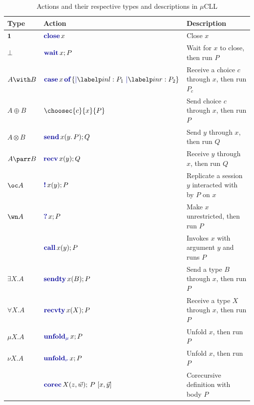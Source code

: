 \begin{table}
    \centering
    \caption{Actions and their respective types and descriptions in $\mu$CLL}
    \label{tab:muCLLActions}
    \begin{tabular}{lll}
        \toprule
        Type          & Action                                            & Description                                           \\
        \midrule
        $\mathbf{1}$  & $\closec{x}$                                      & Close $x$                                             \\
        $\bot$        & $\waitc{x}{P}$                                    & Wait for $x$ to close, then run $P$                   \\
        $A \with B$   & $\casec{x}{\labelc{inl}{P_1}\ \labelc{inr}{P_2}}$ & Receive a choice $c$ through $x$, then run $P_c$      \\
        $A \oplus B$  & $\choosec{c}{x}{P}$                               & Send choice $c$ through $x$, then run $P$             \\
        $A \otimes B$ & $\sendc{x}{y}{P}{Q}$                              & Send $y$ through $x$, then run $Q$                    \\
        $A \parr B$   & $\recvc{x}{y}{Q}$                                 & Receive $y$ through $x$, then run $Q$                 \\
        $\oc A$       & $\bangc{x}{y}{P}$                                 & Replicate a session $y$ interacted with by $P$ on $x$ \\
        $\wn A$       & $\whynotc{x}{P}$                                  & Make $x$ unrestricted, then run $P$                   \\
                      & $\callc{x}{y}{P}$                                 & Invokes $x$ with argument $y$ and runs $P$            \\
        $\exists X.A$ & $\sendtyc{x}{B}{P}$                               & Send a type $B$ through $x$, then run $P$             \\
        $\forall X.A$ & $\recvtyc{x}{X}{P}$                               & Receive a type $X$ through $x$, then run $P$          \\
        $\mu X.A$     & $\unfoldmuc{x}{P}$                                & Unfold $x$, then run $P$                              \\
        $\nu X.A$     & $\unfoldnuc{x}{P}$                                & Unfold $x$, then run $P$                              \\
                      & $\corecc{X}{z, \vec{w}}{P}{x, \vec{y}}$           & Corecursive definition with body $P$                  \\
        \bottomrule
    \end{tabular}
\end{table}

